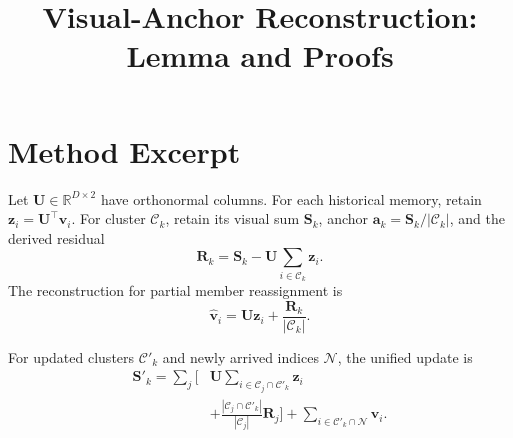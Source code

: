 \documentclass[10pt]{article}
\title{Visual-Anchor Reconstruction: Lemma and Proofs}
\author{}
\date{}
\begin{document}
\maketitle

\section{Method Excerpt}
Let $\mathbf{U}\in\mathbb{R}^{D\times2}$ have orthonormal columns.
For each historical memory, retain
$\mathbf{z}_i=\mathbf{U}^{\top}\mathbf{v}_i$.
For cluster $\mathcal{C}_k$, retain its visual sum $\mathbf{S}_k$,
anchor $\mathbf{a}_k=\mathbf{S}_k/|\mathcal{C}_k|$, and the derived
residual
\begin{equation}
    \mathbf{R}_k=\mathbf{S}_k-
    \mathbf{U}\sum_{i\in\mathcal{C}_k}\mathbf{z}_i.
\end{equation}
The reconstruction for partial member reassignment is
\begin{equation}
\label{eq:vamo-leaf-reconstruction}
    \hat{\mathbf{v}}_i
    =\mathbf{U}\mathbf{z}_i+
     \frac{\mathbf{R}_k}{|\mathcal{C}_k|}.
\end{equation}



For updated clusters $\mathcal{C}'_k$ and newly arrived indices
$\mathcal{N}$, the unified update is
\begin{equation}
\label{eq:vamo-unified-update}
\begin{aligned}
\mathbf{S}'_k
=\sum_j\Bigg[
&\mathbf{U}
 \sum_{i\in\mathcal{C}_j\cap\mathcal{C}'_k}\mathbf{z}_i\\
&+\frac{|\mathcal{C}_j\cap\mathcal{C}'_k|}
 {|\mathcal{C}_j|}\mathbf{R}_j
\Bigg]
+\sum_{i\in\mathcal{C}'_k\cap\mathcal{N}}\mathbf{v}_i.
\end{aligned}
\end{equation}

\appendix

\end{document}
